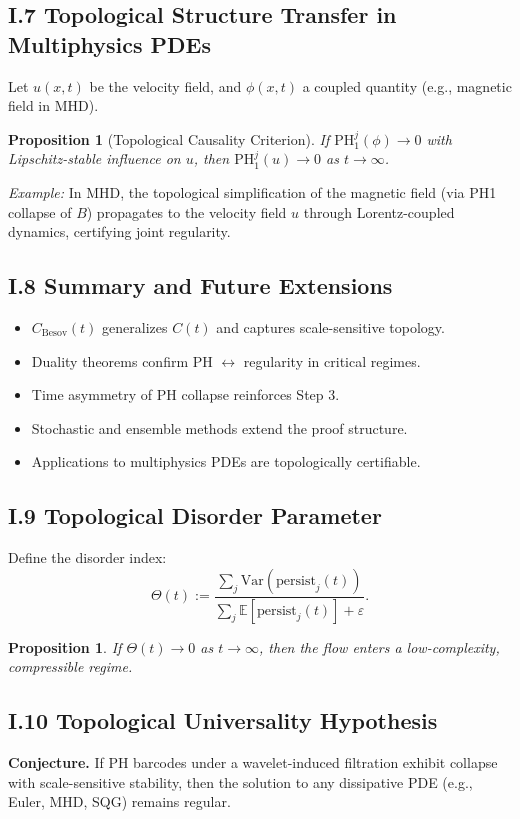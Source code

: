 \documentclass[11pt]{article}
\newtheorem{proposition}[theorem]{Proposition}
\theoremstyle{definition}
\begin{document}
\subsection*{I.7 Topological Structure Transfer in Multiphysics PDEs}
Let $u(x,t)$ be the velocity field, and $\phi(x,t)$ a coupled quantity (e.g., magnetic field in MHD).
\begin{proposition}[Topological Causality Criterion]
If $\mathrm{PH}_1^j(\phi) \to 0$ with Lipschitz-stable influence on $u$, then $\mathrm{PH}_1^j(u) \to 0$ as $t \to \infty$.
\end{proposition}
\textit{Example:} In MHD, the topological simplification of the magnetic field (via PH1 collapse of $B$) propagates to the velocity field $u$ through Lorentz-coupled dynamics, certifying joint regularity.

\subsection*{I.8 Summary and Future Extensions}
\begin{itemize}
  \item $C_{\mathrm{Besov}}(t)$ generalizes $C(t)$ and captures scale-sensitive topology.
  \item Duality theorems confirm PH \ensuremath{\leftrightarrow} regularity in critical regimes.
  \item Time asymmetry of PH collapse reinforces Step 3.
  \item Stochastic and ensemble methods extend the proof structure.
  \item Applications to multiphysics PDEs are topologically certifiable.
\end{itemize}

\subsection*{I.9 Topological Disorder Parameter}
Define the disorder index:
\[
\Theta(t) := \frac{\sum_j \mathrm{Var}(\mathrm{persist}_j(t))}{\sum_j \mathbb{E}[\mathrm{persist}_j(t)] + \varepsilon}.
\]
\begin{proposition}
If $\Theta(t) \to 0$ as $t \to \infty$, then the flow enters a low-complexity, compressible regime.
\end{proposition}

\subsection*{I.10 Topological Universality Hypothesis}
\textbf{Conjecture.} If PH barcodes under a wavelet-induced filtration exhibit collapse with scale-sensitive stability, then the solution to any dissipative PDE (e.g., Euler, MHD, SQG) remains regular.
\end{document}
